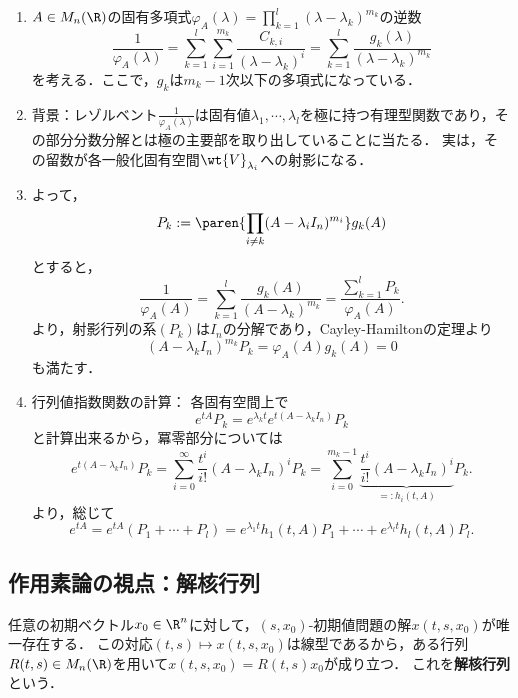 \documentclass[uplatex,dvipdfmx]{jsreport}
\begin{document}
\begin{observation}[レゾルベントによる行列値指数関数の計算]\mbox{}
    \begin{enumerate}[{Step}1]
        \item $A\in M_n(\R)$の固有多項式$\varphi_A(\lambda)=\prod_{k=1}^l(\lambda-\lambda_k)^{m_k}$の逆数
        \[\frac{1}{\varphi_A(\lambda)}=\sum_{k=1}^l\sum_{i=1}^{m_k}\frac{C_{k,i}}{(\lambda-\lambda_k)^i}=\sum_{k=1}^l\frac{g_k(\lambda)}{(\lambda-\lambda_k)^{m_k}}\]
        を考える．ここで，$g_k$は$m_k-1$次以下の多項式になっている．
        \item 背景：レゾルベント$\frac{1}{\varphi_A(\lambda)}$は固有値$\lambda_1,\cdots,\lambda_l$を極に持つ有理型関数であり，その部分分数分解とは極の主要部を取り出していることに当たる．
        実は，その留数が各一般化固有空間$\wt{V}_{\lambda_i}$への射影になる．
        \item よって，
        \[P_k:=\paren{\prod_{i\ne k}(A-\lambda_iI_n)^{m_i}}g_k(A)\]
        とすると，
        \[\frac{1}{\varphi_A(A)}=\sum_{k=1}^l\frac{g_k(A)}{(A-\lambda_k)^{m_k}}=\frac{\sum_{k=1}^lP_k}{\varphi_A(A)}.\]
        より，射影行列の系$(P_k)$は$I_n$の分解であり，Cayley-Hamiltonの定理より
        \[(A-\lambda_kI_n)^{m_k}P_k=\varphi_A(A)g_k(A)=0\]
        も満たす．
        \item 行列値指数関数の計算：
        各固有空間上で
        \[e^{tA}P_k=e^{\lambda_kt}e^{t(A-\lambda_kI_n)}P_k\]
        と計算出来るから，冪零部分については
        \[e^{t(A-\lambda_kI_n)}P_k=\sum_{i=0}^\infty\frac{t^i}{i!}(A-\lambda_kI_n)^iP_k=\sum_{i=0}^{m_k-1}\underbrace{\frac{t^i}{i!}(A-\lambda_kI_n)^i}_{=:h_i(t,A)}P_k.\]
        より，総じて
        \[e^{tA}=e^{tA}(P_1+\cdots+P_l)=e^{\lambda_1t}h_1(t,A)P_1+\cdots+e^{\lambda_lt}h_l(t,A)P_l.\]
    \end{enumerate}
\end{observation}

\subsection{作用素論の視点：解核行列}

\begin{definition}
    任意の初期ベクトル$x_0\in\R^n$に対して，$(s,x_0)$-初期値問題の解$x(t,s,x_0)$が唯一存在する．
    この対応$(t,s)\mapsto x(t,s,x_0)$は線型であるから，ある行列$R(t,s)\in M_n(\R)$を用いて$x(t,s,x_0)=R(t,s)x_0$が成り立つ．
    これを\textbf{解核行列}という．
\end{definition}
\end{document}
